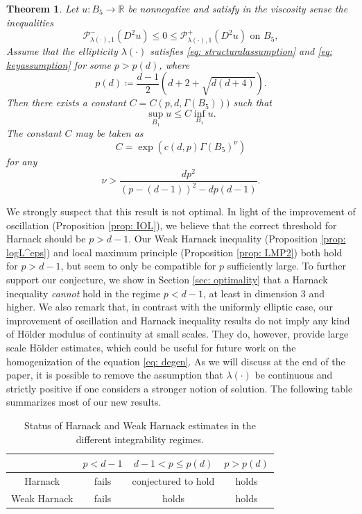 \documentclass[reqno]{amsart}
\numberwithin{equation}{section}
\newtheorem{thm}{Theorem}[section]
\numberwithin{equation}{section}
\newcommand{\R}{\mathbb R}
\newcommand{\ds}{\displaystyle}
\newcounter{case}
\begin{document}
\begin{thm}
\label{thm: Harnack}
Let $u:B_5 \to \R$ be nonnegative and satisfy in the viscosity sense the inequalities
    $$\mathcal{P}^-_{\lambda(\cdot),1}(D^2u)\le 0 \le \mathcal{P}^+_{\lambda(\cdot),1}(D^2u) \text{ on } B_5,$$ Assume that the ellipticity $\lambda(\cdot)$ satisfies \eqref{eq: structuralassumption} and \eqref{eq: keyassumption} for some $p>p(d)$, where 
$$p(d) \coloneqq \ds  \frac{d-1}{2}\left(d+2 + \sqrt{d(d+4)}\right).$$
Then there exists a constant $C = C(p,d,\Gamma(B_5)))$ such that 
$$\sup_{B_1}u \le  C \inf_{B_1}u.$$
The constant $C$ may be taken as  
$$C = \exp(c(d,p)\Gamma(B_5)^\nu)$$
for any 
$$\nu > \frac{dp^2}{(p-(d-1))^2- dp(d-1)}.$$
\end{thm}
We strongly suspect that this result is not optimal. In light of the improvement of oscillation (Proposition \ref{prop: IOL}), we believe that the correct threshold for Harnack should be $p>d-1$. Our Weak Harnack inequality (Proposition \ref{prop: logL^eps}) and local maximum principle (Proposition \ref{prop: LMP2}) both hold for $p>d-1$, but seem to only be compatible for $p$ sufficiently large. To further support our conjecture, we show in Section \ref{sec: optimality} that a Harnack inequality \textit{cannot} hold in the regime $p<d-1$, at least in dimension $3$ and higher. We also remark that, in contrast with the uniformly elliptic case, our improvement of oscillation and Harnack inequality results do not imply any kind of H{\"o}lder modulus of continuity at small scales. They do, however, provide large scale H{\"o}lder estimates, which could be useful for future work on the homogenization of the equation \eqref{eq: degen}. As we will discuss at the end of the paper, it is possible to remove the assumption that $\lambda(\cdot)$ be continuous and strictly positive if one considers a stronger notion of solution. The following table summarizes most of our new results.

\begin{table}[b]
\centering
\renewcommand{\arraystretch}{1.3}
\begin{tabular}{c|c|c|c}
 & $p<d-1$ & $d-1 < p \le p(d)$ & $p>p(d)$ \\
\hline
Harnack & fails & conjectured to hold & holds \\
\hline
Weak Harnack & fails & holds & holds
\end{tabular}
\caption{Status of Harnack and Weak Harnack estimates in the different integrability regimes.}
\label{tab:harnack-regimes}
\end{table}
\end{document}
